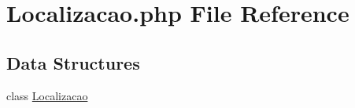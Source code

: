 \hypertarget{_localizacao_8php}{}\section{Localizacao.\+php File Reference}
\label{_localizacao_8php}
\subsection*{Data Structures}
\begin{DoxyCompactItemize}
\item 
class \hyperlink{class_localizacao}{Localizacao}
\end{DoxyCompactItemize}

